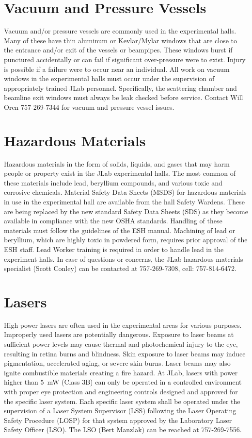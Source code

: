 \documentclass[11pt]{report}
\begin{document}
\section{Vacuum and Pressure Vessels}

Vacuum and/or pressure vessels are commonly used in the experimental halls. Many 
of these have thin aluminum or Kevlar/Mylar windows that are close to the entrance 
and/or exit of the vessels or beampipes. These windows burst if punctured accidentally 
or can fail if significant over-pressure were to exist. Injury is possible if a failure 
were to occur near an individual. All work on vacuum windows in the experimental halls 
must occur under the supervision of appropriately trained JLab personnel. Specifically, 
the scattering chamber and beamline exit windows must always be leak checked before 
service. Contact Will Oren 757-269-7344 for vacuum and pressure vessel issues.

\section{Hazardous Materials}

Hazardous materials in the form of solids, liquids, and gases that may harm people or 
property exist in the JLab experimental halls. The most common of these materials 
include lead, beryllium compounds, and various toxic and corrosive chemicals. Material 
Safety Data Sheets (MSDS) for hazardous materials in use in the experimental hall are 
available from the hall Safety Wardens. These are being replaced by the new standard
Safety Data Sheets (SDS) as they become available in compliance with the new OSHA 
standards. Handling of these materials must follow the guidelines of the ESH manual. 
Machining of lead or beryllium, which are highly toxic in powdered form, requires prior 
approval of the ESH staff. Lead Worker training is required in order to handle lead in 
the experiment halls. In case of questions or concerns, the JLab hazardous materials 
specialist (Scott Conley) can be contacted at 757-269-7308, cell: 757-814-6472.

\section{Lasers}

High power lasers are often used in the experimental areas for various purposes. Improperly 
used lasers are potentially dangerous. Exposure to laser beams at sufficient power levels 
may cause thermal and photochemical injury to the eye, resulting in retina burns and 
blindness. Skin exposure to laser beams may induce pigmentation, accelerated aging, or 
severe skin burns. Laser beams may also ignite combustible materials creating a fire hazard. 
At JLab, lasers with power higher than 5~mW (Class 3B) can only be operated in a controlled 
environment with proper eye protection and engineering controls designed and approved for the 
specific laser system. Each specific laser system shall be operated under the supervision of 
a Laser System Supervisor (LSS) following the Laser Operating Safety Procedure (LOSP) for 
that system approved by the Laboratory Laser Safety Officer (LSO). The LSO (Bert Manzlak) can 
be reached at 757-269-7556.
%
%
\end{document}
